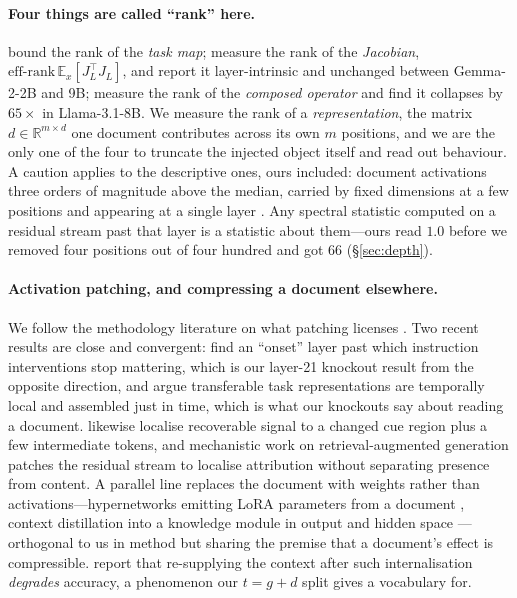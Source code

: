 \documentclass{article}
\newcommand{\dvec}{\ensuremath{d}}
\newcommand{\gvec}{\ensuremath{g}}
\newcommand{\tvec}{\ensuremath{t}}
\begin{document}
\paragraph{Four things are called ``rank'' here.}
\citet{dong2026taskvectorlimits} bound the rank of the \emph{task map};
\citet{sarkar2026causaldim} measure the rank of the \emph{Jacobian},
$\mathrm{eff\text{-}rank}\,\mathbb{E}_x[J_L^\top J_L]$, and report it
layer-intrinsic and unchanged between Gemma-2-2B and 9B;
\citet{fernando2026residualspectral} measure the rank of the \emph{composed
operator} and find it collapses by $65\times$ in Llama-3.1-8B. We measure the
rank of a \emph{representation}, the matrix $\dvec\in\mathbb{R}^{m\times d}$ one
document contributes across its own $m$ positions, and we are the only one of
the four to truncate the injected object itself and read out behaviour. A
caution applies to the descriptive ones, ours included:
\citet{sun2024massive} document activations three orders of magnitude above the
median, carried by fixed dimensions at a few positions and appearing at a single
layer \citep{shi2026melayer}. Any spectral statistic computed on a residual
stream past that layer is a statistic about them---ours read $1.0$ before we
removed four positions out of four hundred and got $66$ (\S\ref{sec:depth}).

\paragraph{Activation patching, and compressing a document elsewhere.}
We follow the methodology literature on what patching licenses
\citep{zhang2023bestpractices, heimersheim2024patching}. Two recent results are
close and convergent: \citet{onset2025instruction} find an ``onset'' layer past
which instruction interventions stop mattering, which is our layer-21 knockout
result from the opposite direction, and \citet{jit2025taskrepr} argue
transferable task representations are temporally local and assembled just in
time, which is what our knockouts say about reading a document.
\citet{semanticconflicts2026} likewise localise recoverable signal to a changed
cue region plus a few intermediate tokens, and mechanistic work on
retrieval-augmented generation \citep{ragcite2026} patches the residual stream
to localise attribution without separating presence from content. A parallel
line replaces the document with weights rather than activations---hypernetworks
emitting LoRA parameters from a document \citep{doc2lora2026}, context
distillation into a knowledge module in output and hidden space
\citep{deepcontextdistill2025}---orthogonal to us in method but sharing the
premise that a document's effect is compressible.
\citet{contextreturns2026} report that re-supplying the context after such
internalisation \emph{degrades} accuracy, a phenomenon our $\tvec=\gvec+\dvec$
split gives a vocabulary for.
\end{document}
